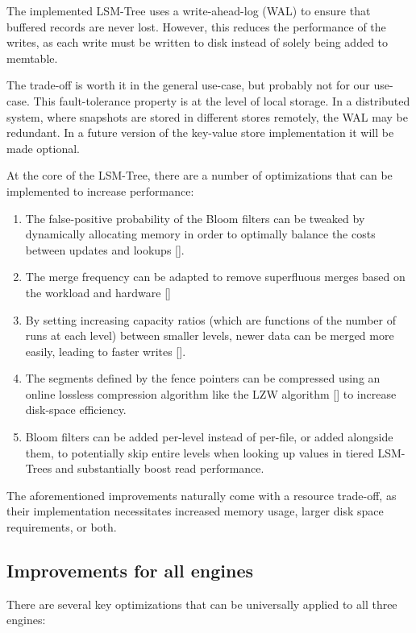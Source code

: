 The implemented LSM-Tree uses a write-ahead-log (WAL) to ensure that buffered records are never lost. However, this reduces the performance of the writes, as each write must be written to disk instead of solely being added to memtable.

The trade-off is worth it in the general use-case, but probably not for our use-case. This fault-tolerance property is at the level of local storage. In a distributed system, where snapshots are stored in different stores remotely, the WAL may be redundant. In a future version of the key-value store implementation it will be made optional.

At the core of the LSM-Tree, there are a number of optimizations that can be implemented to increase performance:

\begin{enumerate}
    \item The false-positive probability of the Bloom filters can be tweaked by dynamically allocating memory in order to optimally balance the costs between updates and lookups [\cite{lsm-monkey}].
    \item The merge frequency can be adapted to remove superfluous merges based on the workload and hardware [\cite{lsm-dostoevsky}]
    \item By setting increasing capacity ratios (which are functions of the number of runs at each level) between smaller levels, newer data can be merged more easily, leading to faster writes [\cite{lsm-wacky}].
    \item The segments defined by the fence pointers can be compressed using an online lossless compression algorithm like the LZW algorithm [\cite{lzw}] to increase disk-space efficiency.
    \item Bloom filters can be added per-level instead of per-file, or added alongside them, to potentially skip entire levels when looking up values in tiered LSM-Trees and substantially boost read performance.
\end{enumerate}

The aforementioned improvements naturally come with a resource trade-off, as their implementation necessitates increased memory usage, larger disk space requirements, or both.

\subsection{Improvements for all engines}

There are several key optimizations that can be universally applied to all three engines:

